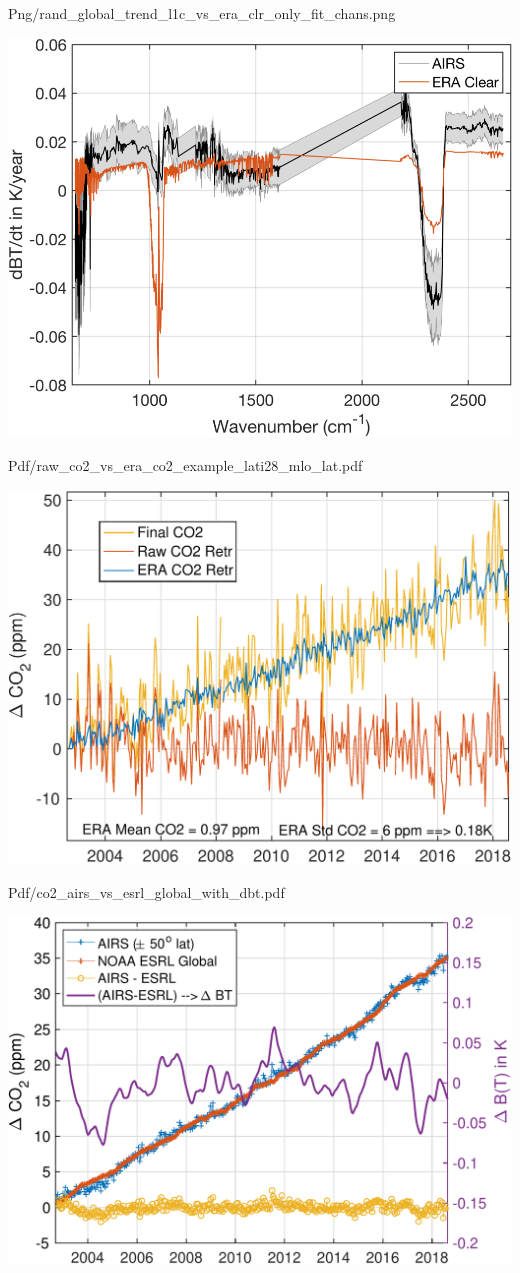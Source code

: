 \documentclass[presentation]{beamer}
\begin{document}
\begin{frame}[label={sec:orgaa0ee62}]{Png/rand\_global\_trend\_l1c\_vs\_era\_clr\_only\_fit\_chans.png}
\begin{center}
\includegraphics[width=0.7\linewidth]{./Figs/Png/rand_global_trend_l1c_vs_era_clr_only_fit_chans.png}
\end{center}
\end{frame}


\begin{frame}[label={sec:org89371e8}]{Pdf/raw\_co2\_vs\_era\_co2\_example\_lati28\_mlo\_lat.pdf}
\begin{center}
\includegraphics[width=0.7\linewidth]{./Figs/Pdf/raw_co2_vs_era_co2_example_lati28_mlo_lat.pdf}
\end{center}
\end{frame}

\begin{frame}[label={sec:org313472e}]{Pdf/co2\_airs\_vs\_esrl\_global\_with\_dbt.pdf}
\begin{center}
\includegraphics[width=0.7\linewidth]{./Figs/Pdf/co2_airs_vs_esrl_global_with_dbt.pdf}
\end{center}
\end{frame}
\end{document}
